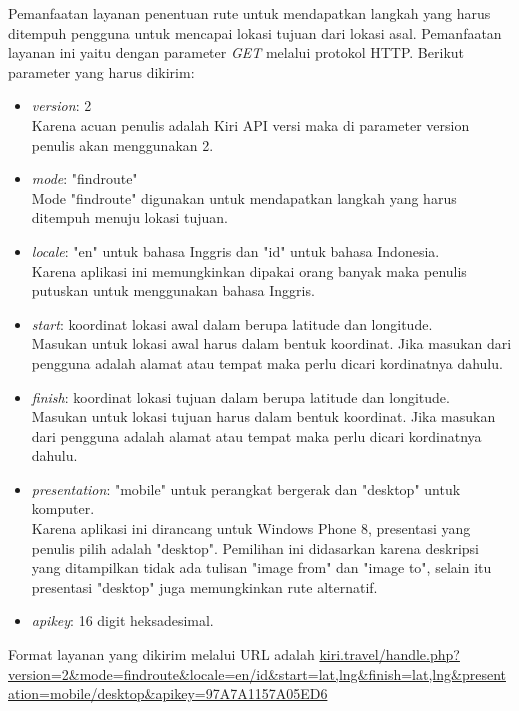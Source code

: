 Pemanfaatan layanan penentuan rute untuk mendapatkan langkah yang harus ditempuh pengguna untuk mencapai lokasi tujuan dari lokasi asal. Pemanfaatan layanan ini yaitu dengan parameter \textit{GET} melalui protokol HTTP. Berikut parameter yang harus dikirim:
\begin{itemize}
	\item \textit{version}: 2 \\
	Karena acuan penulis adalah Kiri API versi maka di parameter version penulis akan menggunakan 2.
	\item \textit{mode}: "findroute" \\
	Mode "findroute" digunakan untuk mendapatkan langkah yang harus ditempuh menuju lokasi tujuan.
	\item \textit{locale}: "en" untuk bahasa Inggris dan "id" untuk bahasa Indonesia. \\
	Karena aplikasi ini memungkinkan dipakai orang banyak maka penulis putuskan untuk menggunakan bahasa Inggris.
	\item \textit{start}: koordinat lokasi awal dalam berupa latitude dan longitude. \\
	Masukan untuk lokasi awal harus dalam bentuk koordinat. Jika masukan dari pengguna adalah alamat atau tempat maka perlu dicari kordinatnya dahulu.
	\item \textit{finish}: koordinat lokasi tujuan dalam berupa latitude dan longitude. \\
	Masukan untuk lokasi tujuan harus dalam bentuk koordinat. Jika masukan dari pengguna adalah alamat atau tempat maka perlu dicari kordinatnya dahulu.
	\item \textit{presentation}: "mobile" untuk perangkat bergerak dan "desktop" untuk komputer. \\
	Karena aplikasi ini dirancang untuk Windows Phone 8, presentasi yang penulis pilih adalah "desktop". Pemilihan ini didasarkan karena deskripsi yang ditampilkan tidak ada tulisan "image from" dan "image to", selain itu presentasi "desktop" juga memungkinkan rute alternatif. 
	\item \textit{apikey}: 16 digit heksadesimal.
\end{itemize}

Format layanan yang dikirim melalui URL adalah \url{kiri.travel/handle.php?version=2&mode=findroute&locale=en/id&start=lat,lng&finish=lat,lng&presentation=mobile/desktop&apikey=97A7A1157A05ED6}

